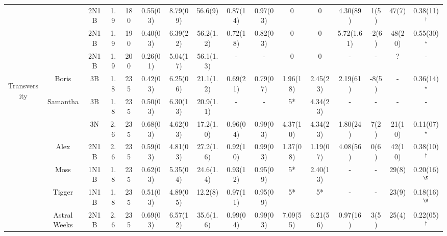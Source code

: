 \documentclass[pdftex,letterpaper,12pt]{report}
\begin{document}
\begin{table}
\begin{center}
\begin{tabular}{|c|c|ccc|ccc|ccccc|cc|c|}
			&  & 2N1B & 1.9 & 180 & 0.55(03) & 8.79(09) & 56.6(9) & 0.87(14) & 0.97(03) & 0 & 0 & 4.30(89) & 1(5) & 47(7) & 0.38(11)$^\dagger$ \\
			&  & 2N1B & 1.9 & 190 & 0.40(03) & 6.39(22) & 56.2(1.2) & 0.72(18) & 0.82(03) & 0 & 0 & 5.72(1.61) & -2(6) & 48(20) & 0.55(30)$^\star$ \\
			&  & 2N1B & 1.9 & 200 & 0.26(01) & 5.04(17) & 56.1(1.3) & - & - & 0 & 0 & - & - & ? & - \\
			\hline
			\hline
			\multirow{12}{*}{\begin{sideways}Transversity\end{sideways}} & Boris & 3B & 1.8 & 235 & 0.42(03) & 6.25(06) & 21.1(1.2) & 0.69(21) & 0.79(07) & 1.96(18) & 2.45(23) & 2.19(61) & -8(5) & - & 0.36(14)$^\star$ \\
			\cline{2-16}
			& \multirow{2}{*}{Samantha} & 3B & 1.8 & 235 & 0.50(03) & 6.30(13) & 20.9(1.1) & - & - & 5* & 4.34(23) & - & - & - & -\\
			& & 3N & 2.6 & 235 & 0.68(03) & 4.62(03) & 17.2(1.0) & 0.96(04) & 0.99(03) & 4.37(10) & 4.34(23) & 1.80(24) & 7(2) & 21(10) & 0.11(07)$^\star$\\
			\cline{2-16}
			& Alex & 2N1B & 2.6 & 235 & 0.59(03) & 4.81(03) & 27.2(1.6) & 0.92(10) & 0.99(03) & 1.37(08) & 1.19(07) & 4.08(56) & 0(6) & 42(10) & 0.38(10)$^\dagger$ \\
			\cline{2-16}
			& Moss & 1N1B & 1.8 & 235 & 0.62(03) & 5.35(04) & 24.6(1.4) & 0.93(12) & 0.95(09) & 5* & 2.40(13) & - & - & 29(8) & 0.20(16)$^\S$\\
			\cline{2-16}
			& Tigger & 1N1B & 1.8 & 235 & 0.51(03) & 4.89(05) & 12.2(8) & 0.97(11) & 0.95(09) & 5* & 5* & - & - & 23(9) & 0.18(16)$^\S$\\
			\cline{2-16}
			& Astral Weeks & 2N1B & 2.6 & 235 & 0.69(03) & 6.57(12) & 35.6(1.6) & 0.99(04) & 0.99(03) & 7.09(55) & 6.21(56) & 0.97(16) & 3(5) & 25(4) & 0.22(05)$^\dagger$\\

\end{tabular}
\end{center}
\end{table}
\end{document}
